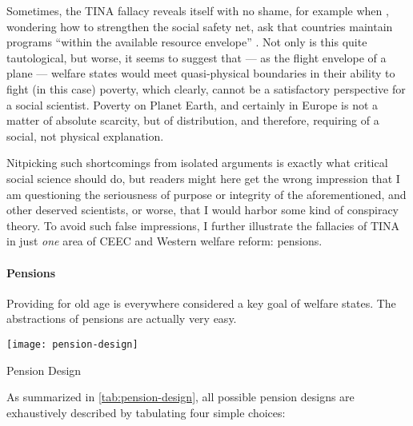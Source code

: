 Sometimes, the TINA fallacy reveals itself with no shame, for example when \citeauthor{Grow2005}, wondering how to strengthen the social safety net, ask that countries maintain programs ``within the available resource envelope'' \citeyearpar[39]{Grow2005}.
Not only is this quite tautological, but worse, it seems to suggest that --- as the flight envelope of a plane --- welfare states would meet quasi-physical boundaries in their ability to fight (in this case) poverty, which clearly, cannot be a satisfactory perspective for a social scientist.
Poverty on Planet Earth, and certainly in Europe is not a matter of absolute scarcity, but of distribution, and therefore, requiring of a social, not physical explanation.

Nitpicking such shortcomings from isolated arguments is exactly what critical social science should do, but readers might here get the wrong impression that I am questioning the seriousness of purpose or integrity of the aforementioned, and other deserved scientists, or worse, that I would harbor some kind of conspiracy theory.
To avoid such false impressions, I further illustrate the fallacies of TINA in just \emph{one} area of \gls{CEEC} and Western welfare reform:
pensions.

\paragraph{Pensions}  \label{sec:pensions}
Providing for old age is everywhere considered a key goal of welfare states.
The abstractions of pensions are actually very easy.

 \begin{table}[htbp]
	\centering
	\texttt{[image: pension-design]}
	\caption{Pension Design}
	\label{tab:pension-design}
\end{table}%

As summarized in \autoref{tab:pension-design}, all possible pension designs are exhaustively described by tabulating four simple choices:

